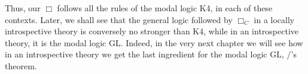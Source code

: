Thus, our $\Box$ follows all the rules of the modal logic K4, in each of these contexts. Later, we shall see that the general logic followed by $\Box_C$ in a locally introspective theory is conversely no stronger than K4, while in an introspective theory, it is the modal logic GL. Indeed, in the very next chapter we will see how in an introspective theory we get the last ingredient for the modal logic GL, \Loeb/'s theorem.


\fileend